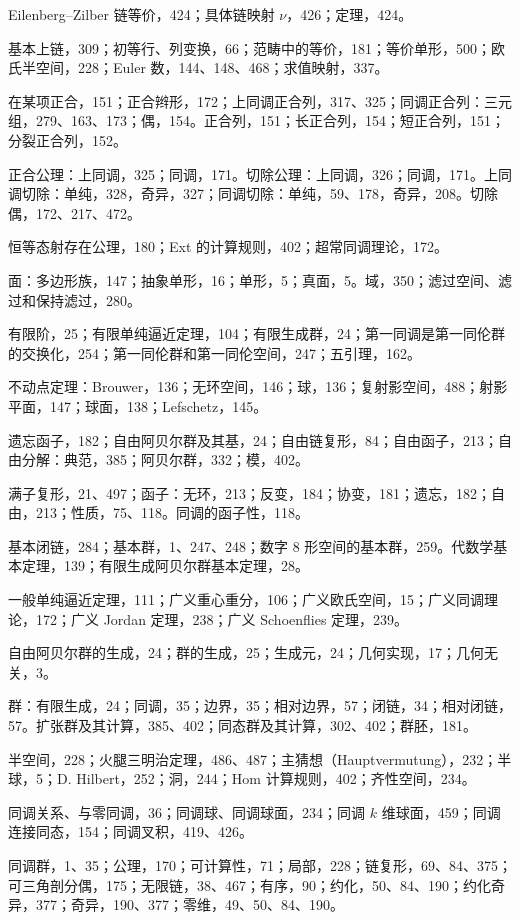Eilenberg--Zilber 链等价，424；具体链映射 $\nu$，426；定理，424。

基本上链，309；初等行、列变换，66；范畴中的等价，181；等价单形，500；欧氏半空间，228；Euler 数，144、148、468；求值映射，337。

在某项正合，151；正合辫形，172；上同调正合列，317、325；同调正合列：三元组，279、163、173；偶，154。正合列，151；长正合列，154；短正合列，151；分裂正合列，152。

正合公理：上同调，325；同调，171。切除公理：上同调，326；同调，171。上同调切除：单纯，328，奇异，327；同调切除：单纯，59、178，奇异，208。切除偶，172、217、472。

恒等态射存在公理，180；Ext 的计算规则，402；超常同调理论，172。

面：多边形族，147；抽象单形，16；单形，5；真面，5。域，350；滤过空间、滤过和保持滤过，280。

有限阶，25；有限单纯逼近定理，104；有限生成群，24；第一同调是第一同伦群的交换化，254；第一同伦群和第一同伦空间，247；五引理，162。

不动点定理：Brouwer，136；无环空间，146；球，136；复射影空间，488；射影平面，147；球面，138；Lefschetz，145。

遗忘函子，182；自由阿贝尔群及其基，24；自由链复形，84；自由函子，213；自由分解：典范，385；阿贝尔群，332；模，402。

满子复形，21、497；函子：无环，213；反变，184；协变，181；遗忘，182；自由，213；性质，75、118。同调的函子性，118。

基本闭链，284；基本群，1、247、248；数字 $8$ 形空间的基本群，259。代数学基本定理，139；有限生成阿贝尔群基本定理，28。

一般单纯逼近定理，111；广义重心重分，106；广义欧氏空间，15；广义同调理论，172；广义 Jordan 定理，238；广义 Schoenflies 定理，239。

自由阿贝尔群的生成，24；群的生成，25；生成元，24；几何实现，17；几何无关，3。

群：有限生成，24；同调，35；边界，35；相对边界，57；闭链，34；相对闭链，57。扩张群及其计算，385、402；同态群及其计算，302、402；群胚，181。

半空间，228；火腿三明治定理，486、487；主猜想（Hauptvermutung），232；半球，5；D. Hilbert，252；洞，244；Hom 计算规则，402；齐性空间，234。

同调关系、与零同调，36；同调球、同调球面，234；同调 $k$ 维球面，459；同调连接同态，154；同调叉积，419、426。

同调群，1、35；公理，170；可计算性，71；局部，228；链复形，69、84、375；可三角剖分偶，175；无限链，38、467；有序，90；约化，50、84、190；约化奇异，377；奇异，190、377；零维，49、50、84、190。

